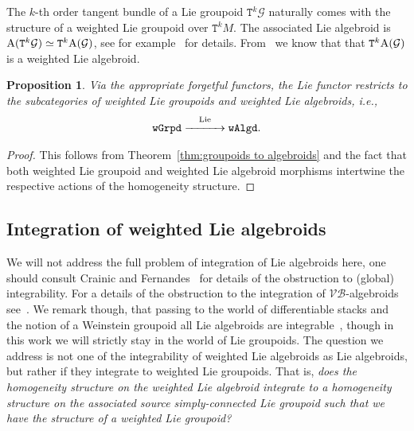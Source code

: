 \documentclass[pdftex]{sigma}
\newcommand{\Lie}{\textnormal{Lie}}
\newcommand{\catname}[1]{\textnormal{\texttt{#1}}}
\def\sT{{\mathtt T}}
\numberwithin{equation}{section}
\newtheorem{Proposition}[Theorem]{Proposition}
 { \theoremstyle{definition}
\newtheorem{Definition}[Theorem]{Definition}
\newtheorem{Example}[Theorem]{Example}
\newtheorem{Remark}[Theorem]{Remark} }
\begin{document}
\begin{Example}
The $k$-th order tangent bundle of a Lie groupoid $\sT^{k}\mathcal{G}$ naturally comes with the structure of a weighted Lie groupoid over $\sT^{k}M$. The associated Lie algebroid is $\textnormal{A}(\sT^{k}\mathcal{G}) \simeq \sT^{k}\textnormal{A}(\mathcal{G})$, see  for example~\cite{KouotchopWamba:2013} for details. From~\cite{Bruce:2014} we know that that  $\sT^{k}\textnormal{A}(\mathcal{G})$ is a weighted Lie algebroid.
\end{Example}


\begin{Proposition}
Via the appropriate forgetful functors, the Lie functor restricts to the sub\-ca\-te\-gories of weighted Lie groupoids and weighted Lie algebroids, i.e.,
\begin{gather*}
\catname{wGrpd} \stackrel{\Lie}{\xrightarrow{\hspace*{30pt}}} \catname{wAlgd}.
\end{gather*}
\end{Proposition}

\begin{proof}
This follows from Theorem~\ref{thm:groupoids to algebroids} and the fact that both weighted Lie groupoid and weighted Lie algebroid morphisms intertwine the respective actions of the homogeneity structure.
\end{proof}



\subsection{Integration  of weighted Lie algebroids}
 We will not address the full problem of integration of Lie algebroids here, one should consult Crainic and  Fernandes~\cite{Crainic:2003} for details of the obstruction to (global) integrability.  For a details of the obstruction to the integration of $\mathcal{VB}$-algebroids see~\cite{Brahic:2014}. We remark though, that passing to the world of dif\/ferentiable stacks and the notion of a Weinstein groupoid all Lie algebroids are integrable~\cite{Tseng:2006}, though in this work we will strictly stay in the world of Lie groupoids. The question we address is not one of the integrability of weighted Lie algebroids as Lie algebroids, but rather if they integrate to weighted Lie groupoids. That is, \emph{does the homogeneity structure on the weighted Lie algebroid integrate to a homogeneity structure on the associated source simply-connected Lie groupoid such that we have the structure of a weighted Lie groupoid?}
\end{document}
